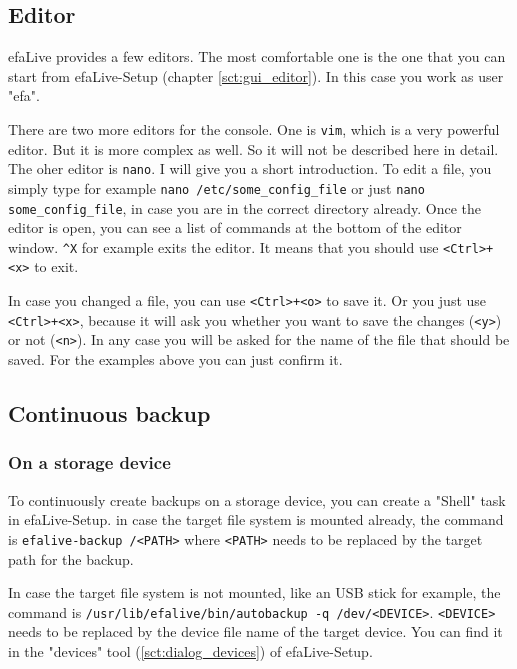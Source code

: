 \documentclass[a4paper,12pt,twoside]{article}
\begin{document}
\subsection{Editor}
\label{sct:editor}
efaLive provides a few editors. The
most comfortable one is the one that you can start from efaLive-Setup
(chapter \ref{sct:gui_editor}). In this case you work as user
"efa".

There are two more editors for the console. One is
\texttt{vim}, which is a very powerful editor. But
it is more complex as well. So it will not be described here in detail.
The oher editor is \texttt{nano}. I will give you
a short introduction. To edit a file, you simply type for example
\texttt{nano /etc/some\_config\_file} or
just \texttt{nano some\_config\_file}, in case you are
in the correct directory already. Once the editor is open, you can see
a list of commands at the bottom of the editor window.
\texttt{\^{}X} for example exits the editor. It
means that you should use
\texttt{{\textless}Ctrl{\textgreater}+{\textless}x{\textgreater}} to exit.

In case you changed a file, you can use
\texttt{{\textless}Ctrl{\textgreater}+{\textless}o{\textgreater}} to save it. Or
you just use \texttt{{\textless}Ctrl{\textgreater}+{\textless}x{\textgreater}},
because it will ask you whether you want to save the changes
(\texttt{{\textless}y{\textgreater}}) or not (\texttt{{\textless}n{\textgreater}}). In
any case you will be asked for the name of the file that should be
saved. For the examples above you can just confirm it.


\subsection{Continuous backup}
\label{sct:cont_backup}
\subsubsection{On a storage device}
\label{sct:cont_device}
To continuously create backups on a storage device, you can create a "Shell" task
in efaLive-Setup. in case the target file system is mounted already, the command is 
\texttt{efalive-backup /{\textless}PATH{\textgreater}} where 
\texttt{{\textless}PATH{\textgreater}} needs to be replaced by the 
target path for the backup.

In case the target file system is not mounted, like an USB stick for example, the 
command is \texttt{/usr/lib/efalive/bin/autobackup -q /dev/{\textless}DEVICE{\textgreater}}.
\texttt{{\textless}DEVICE{\textgreater}} needs 
to be replaced by the device file name of the target device. You can find it in the 
"devices" tool (\ref{sct:dialog_devices}) of efaLive-Setup.
\end{document}
